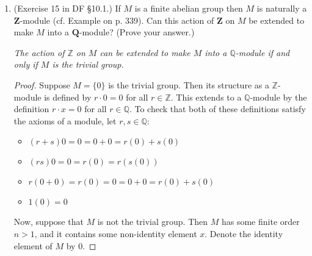 \documentclass[10pt]{article}
\newcommand{\Q}{\mathbb{Q}}
\newcommand{\Z}{\mathbb{Z}}
\begin{document}
\begin{enumerate}
(b) Let $I = 2 \mathbf{Z}$.  Describe the annihilator of $I$ in $M$ as a direct product of cyclic groups.  (The annihilator of an ideal $I \subset \mathbf{Z}$ is defined to be the subset $\{x \in M: ax=0 \text{ for all } a \in I\}$.  By Exercise 10 in \S 10.1 (which you may take for granted), the annihilator of $I$ is a submodule of $M$.)

\begin{proof}
Let $x = (a,b,c) \in M$.  $rx = 0$ for all $r \in I$  if and only if $24 \mid ra$, $15 \mid rb$, and $50 \mid rc$ for all $r \in 2\Z$, or equivalently $24 \mid 2sa$, $15 \mid 2sb$, and $50 \mid 2sc$ for all $s \in \Z$.

$24 \mid 2sa$ for all $s \in \Z$ if and only if $a = 0$ or $a = 12$.
$15 \mid 2sb$ for all $s \in \Z$ if and only if $b = 0$.
$50 \mid 2sc$ if and only if $c = 0$ or $c = 25$.
This means that the annihilator of $I$ in $M$ is the submodule
$$
\{0,12\} \times \{0\} \times \{0,25\}.
$$
Each of these groups are cyclic (each is isomorphic to either $\Z / 2\Z$ or the trivial group), so this is a direct product of cyclic groups.
\end{proof}

\item (Exercise 15 in DF \S 10.1.)  If $M$ is a finite abelian group then $M$ is naturally a $\mathbf{Z}$-module (cf. Example on p. 339).  Can this action of $\mathbf{Z}$ on $M$ be extended to make $M$ into a $\mathbf{Q}$-module?  (Prove your answer.)

\noindent \emph{The action of $\Z$ on $M$ can be extended to make $M$ into a $\Q$-module if and only if $M$ is the trivial group.}

\begin{proof}
Suppose $M = \{0\}$ is the trivial group.  Then its structure as a $\Z$-module is defined by $r \cdot 0 = 0$ for all $r \in \Z$.  This extends to a $\Q$-module by the definition $r\cdot x = 0$ for all $r \in \Q$.  To check that both of these definitions satisfy the axioms of a module, let $r,s \in \Q$:
\begin{itemize}
\item $(r + s)0 = 0 = 0 + 0 = r(0) + s(0)$
\item $(rs)0 = 0 = r(0) = r(s(0))$
\item $r(0+0) = r(0) = 0 = 0+0 = r(0) + s(0)$
\item $1(0) = 0$
\end{itemize}

Now, suppose that $M$ is not the trivial group.  Then $M$ has some finite order $n > 1$, and it contains some non-identity element $x$.  Denote the identity element of $M$ by $0$.


\end{proof}
\end{enumerate}
\end{document}
